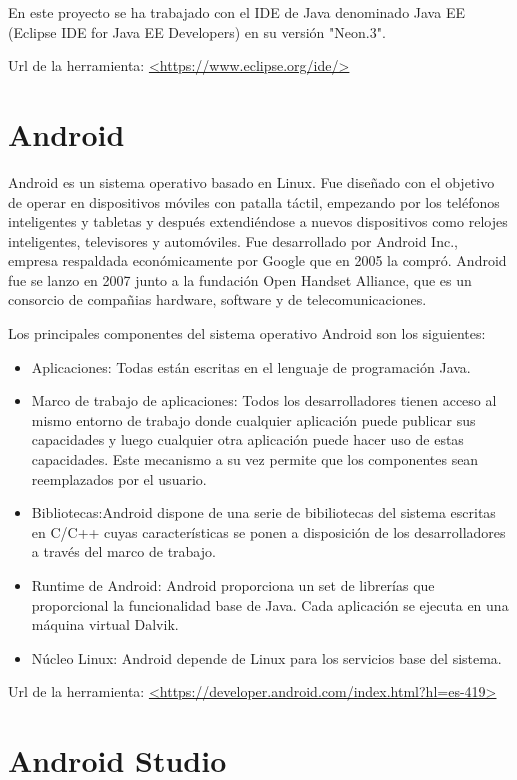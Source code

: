 En este proyecto se ha trabajado con el IDE de Java denominado Java EE (Eclipse IDE for Java EE Developers) en su versión "Neon.3".

Url de la herramienta: \url{<https://www.eclipse.org/ide/>}

\section{Android}

Android es un sistema operativo basado en Linux. Fue diseñado con el objetivo de operar en dispositivos móviles con patalla táctil, empezando por los teléfonos inteligentes y tabletas y después extendiéndose a nuevos dispositivos como relojes inteligentes, televisores y automóviles. Fue desarrollado por Android Inc., empresa respaldada económicamente por Google que en 2005 la compró. Android fue se lanzo en 2007 junto a la fundación Open Handset Alliance, que es un consorcio de compañias hardware, software y de telecomunicaciones.\cite{wiki:android}

Los principales componentes del sistema operativo Android son los siguientes:

\begin{itemize}
	\item{Aplicaciones}: Todas están escritas en el lenguaje de programación Java.
	\item{Marco de trabajo de aplicaciones}: Todos los desarrolladores tienen acceso al mismo entorno de trabajo donde cualquier aplicación puede publicar sus capacidades y luego cualquier otra aplicación puede hacer uso de estas capacidades. Este mecanismo a su vez permite que los componentes sean reemplazados por el usuario.
	\item{Bibliotecas}:Android dispone de una serie de bibiliotecas del sistema escritas en C/C++ cuyas características se ponen a disposición de los desarrolladores a través del marco de trabajo.
	\item{Runtime de Android}: Android proporciona un set de librerías que proporcional la funcionalidad base de Java. Cada aplicación se ejecuta en una máquina virtual Dalvik.
	\item{Núcleo Linux}: Android depende de Linux para los servicios base del sistema.
\end{itemize}


Url de la herramienta: \url{<https://developer.android.com/index.html?hl=es-419>}

\section{Android Studio}

